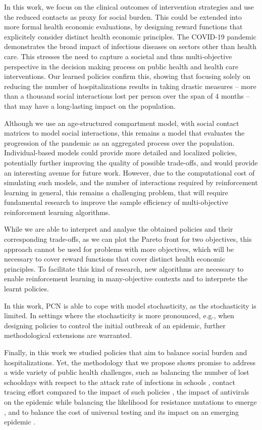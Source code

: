 \documentclass{article}
\renewcommand{\cite}[1]{\citep{#1}}
\begin{document}
In this work, we focus on the clinical outcomes of intervention strategies and use the reduced contacts as proxy for social burden. This could be extended into more formal health economic evaluations, by designing reward functions that explicitely consider distinct health economic principles. The COVID-19 pandemic demonstrates the broad impact of infectious diseases on sectors other than health care. This stresses the need to capture a societal and thus multi-objective perspective in the decision making process on public health and health care interventions. Our learned policies confirm this, showing that focusing solely on reducing the number of hospitalizations results in taking drastic measures -- more than a thousand social interactions lost per person over the span of 4 months -- that may have a long-lasting impact on the population.

Although we use an age-structured compartment model, with social contact matrices to model social interactions, this remains a model that evaluates the progression of the pandemic as an aggregated process over the population. Individual-based models could provide more detailed and localized policies, potentially further improving the quality of possible trade-offs, and would provide an interesting avenue for future work. However, due to the computational cost of simulating such models, and the number of interactions required by reinforcement learning in general, this remains a challenging problem, that will require fundamental research to improve the sample efficiency of  multi-objective reinforcement learning algorithms.

While we are able to interpret and analyse the obtained policies and their corresponding trade-offs, as we can plot the Pareto front for two objectives, this approach cannot be used for problems with more objectives, which will be necessary to cover reward functions that cover distinct health economic principles. To facilitate this kind of research, new algorithms are necessary to enable reinforcement learning in many-objective contexts and to interprete the learnt policies.

In this work, PCN is able to cope with model stochasticity, as the stochasticity is limited. In settings where the stochasticity is more pronounced, e.g., when designing policies to control the initial outbreak of an epidemic, further methodological extensions are warranted.

Finally, in this work we studied policies that aim to balance social burden and hospitalizations. Yet, the methodology that we propose shows promise to address a wide variety of public health challenges, such as balancing the number of lost schooldays with respect to the attack rate of infections in schools \cite{torneri2021controlling}, contact tracing effort compared to the impact of such policies \cite{willem2021impact}, the impact of antivirals on the epidemic while balancing the likelihood for resistance mutations to emerge \cite{torneri2020prospect}, and to balance the cost of universal testing and its impact on an emerging epidemic \cite{libin2021assessing}.
\end{document}
